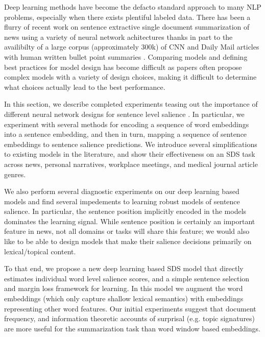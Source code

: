 

Deep learning methods have become the defacto standard approach to many 
NLP problems, especially when there exists plentiful labeled data.
There has been a flurry of recent work on sentence extractive 
single document summarization of news using a variety of neural network 
achitectures 
\citep{cheng2016neural,nallapati2016classify,nallapati2016summarunner,narayan2018ranking} 
thanks in part to the availibilty of a large corpus 
(approximately 300k) of CNN and Daily Mail articles with human written bullet 
point summaries \citep{hermann2015teaching}.
Comparing models and defining best practices for model design has become 
difficult as papers often propose complex models with a variety
of design choices, making it difficult to determine what choices actually
lead to the best performance. 

In this section, we describe completed experiments teasing out the importance
of different neural network designs for sentence level salience 
\citep{kedzie2018deep}. 
In particular, we experiment with several methods for encoding a sequence
of word embeddings into a sentence embedding, and then in turn, mapping
a sequence of sentence embeddings to sentence salience predictions. We 
introduce several simplifications to existing models in the literature, and
show their effectiveness on an SDS task across news, personal narratives,
workplace meetings, and medical journal article genres.

We also perform several diagnostic experiments on our deep learning based 
models and find several impedements to learning robust models of 
sentence salience. In particular, the sentence position implicitly 
encoded in the models dominates the learning signal. While sentence position
is certainly an important feature in news, not all domains or tasks 
will share this feature;
 we would also like to be able to design
models that make their salience decisions primarily on lexical/topical content.

To that end, we propose a new deep learning based SDS model that directly 
estimates individual word level salience scores, and a simple sentence 
selection and margin loss framework for learning. In this model 
we augment the word embeddings (which only capture shallow lexical semantics)
with embeddings representing other word features. Our initial experiments
suggest that document frequency, and information theoretic accounts of 
surprisal (e.g. topic signatures) are more useful for the summarization task
than word window based embeddings.

